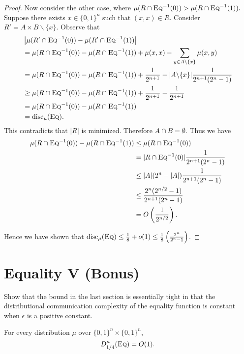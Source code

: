 \begin{proof}
    Now consider the other case, where $\mu(R\cap \textsc{Eq}^{-1}(0)) > \mu(R\cap \textsc{Eq}^{-1}(1)).$ Suppose there exists $x \in \{0,1\}^n$ such that $(x,x) \in R.$ Consider $R' = A\times B\backslash\{x\}.$ Observe that
    \begin{align*}
        &\left|\mu(R'\cap \textsc{Eq}^{-1}(0)) - \mu(R'\cap \textsc{Eq}^{-1}(1))\right|\\ & = \mu(R\cap \textsc{Eq}^{-1}(0))-\mu(R\cap \textsc{Eq}^{-1}(1))  + \mu(x,x)- \sum_{y\in A\backslash\{x\}} \mu(x,y)\\
        &= \mu(R\cap \textsc{Eq}^{-1}(0))-\mu(R\cap \textsc{Eq}^{-1}(1)) + \frac{1}{2^{n+1}} - |A\backslash\{x\}|\frac{1}{2^{n+1}(2^n-1)} \\
        &\geq \mu(R\cap \textsc{Eq}^{-1}(0))-\mu(R\cap \textsc{Eq}^{-1}(1)) + \frac{1}{2^{n+1}} - \frac{1}{2^{n+1}} \\
        &= \mu(R\cap \textsc{Eq}^{-1}(0))-\mu(R\cap \textsc{Eq}^{-1}(1))\\
        &= \mathrm{disc}_\mu(\textsc{Eq}).
    \end{align*}
    This contradicts that $|R|$ is minimized. Therefore $A\cap B = \emptyset$. Thus we have
    \begin{align*}
        \mu(R\cap \textsc{Eq}^{-1}(0))-\mu(R\cap \textsc{Eq}^{-1}(1)) &\leq \mu(R\cap \textsc{Eq}^{-1}(0))\\
        &= |R\cap \textsc{Eq}^{-1}(0)|\frac{1}{2^{n+1}(2^n-1)} \\
        &\leq |A|(2^n-|A|)\frac{1}{2^{n+1}(2^n-1)}\\
        &\leq \frac{2^{n}(2^{n/2}-1)}{2^{n+1}(2^n-1)}\\
        &= O\left(\frac{1}{2^{n/2}}\right).
    \end{align*}

    Hence we have shown that $\mathrm{disc}_\mu(\textsc{Eq}) \leq \frac{1}{8} + o(1) \leq \frac{1}{8}\left(\frac{2^n}{2^n-1}\right)$.
\end{proof}



\newpage \section{Equality V (Bonus)}

Show that the bound in the last section is essentially tight in that the distributional communication complexity of the equality function is constant when $\epsilon$ is a positive constant.

\begin{theorem}
For every distribution $\mu$ over $\{0,1\}^n \times \{0,1\}^n$,
\[
D^\mu_{1/4}(\textsc{Eq}) = O(1).
\]
\end{theorem}

